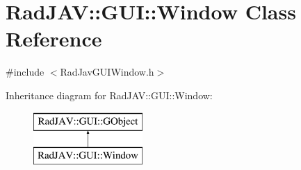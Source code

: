 \hypertarget{class_rad_j_a_v_1_1_g_u_i_1_1_window}{}\section{Rad\+J\+AV\+:\+:G\+UI\+:\+:Window Class Reference}
\label{class_rad_j_a_v_1_1_g_u_i_1_1_window}


{\ttfamily \#include $<$Rad\+Jav\+G\+U\+I\+Window.\+h$>$}

Inheritance diagram for Rad\+J\+AV\+:\+:G\+UI\+:\+:Window\+:\begin{figure}[H]
\begin{center}
\leavevmode
\includegraphics[height=2.000000cm]{class_rad_j_a_v_1_1_g_u_i_1_1_window}
\end{center}
\end{figure}

